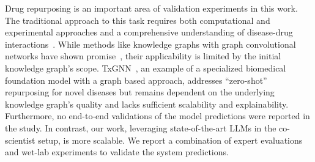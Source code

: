 Drug repurposing is an important area of validation experiments in this work. The traditional approach to this task requires both computational and experimental approaches and a comprehensive understanding of disease-drug interactions~\cite{pushpakom2019drug, krishnamurthy2022drug}. While methods like knowledge graphs with graph convolutional networks have shown promise~\cite{zitnik2018modeling, morselli2021network}, their applicability is limited by the initial knowledge graph's scope.  TxGNN~\cite{huang2024foundation}, an example of a specialized biomedical foundation model with a graph based approach, addresses ``zero-shot'' repurposing for novel diseases but remains dependent on the underlying knowledge graph's quality and lacks sufficient scalability and explainability. Furthermore, no end-to-end validations of the model predictions were reported in the study. In contrast, our work, leveraging state-of-the-art LLMs in the co-scientist setup, is more scalable. We report a combination of expert evaluations and wet-lab experiments to validate the system predictions.



\clearpage
